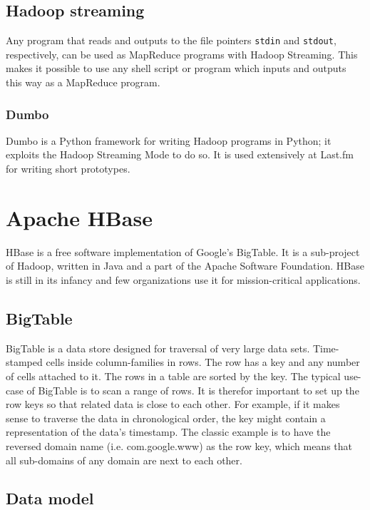\subsection*{Hadoop streaming}

Any program that reads and outputs to the file pointers \texttt{stdin} and
\texttt{stdout}, respectively, can be used as MapReduce programs with
Hadoop Streaming. This makes it possible to use any shell script or
program which inputs and outputs this way as a MapReduce program.


\subsubsection*{Dumbo}

Dumbo is a Python framework for writing Hadoop programs in Python; it exploits
the Hadoop Streaming Mode to do so. It is used extensively at Last.fm for
writing short prototypes. \cite{dumbo}


\section{Apache HBase}

HBase is a free software implementation of Google's BigTable. \cite{bigtable} It
is a sub-project of Hadoop, written in Java and a part of the Apache Software
Foundation. HBase is still in its infancy and few organizations use it for
mission-critical applications. \cite{hbase}


\subsection{BigTable}

BigTable is a data store designed for traversal of very large data sets.
Time-stamped cells inside column-families in rows. The row has a key and any
number of cells attached to it. The rows in a table are sorted by the key.
The typical use-case of BigTable is to scan a range of rows. It is therefor
important to set up the row keys so that related data is close to each other.
For example, if it makes sense to traverse the data in chronological order, the
key might contain a representation of the data's timestamp. The classic example
is to have the reversed domain name (i.e. com.google.www) as the row key, which
means that all sub-domains of any domain are next to each other.


\subsection{Data model}

